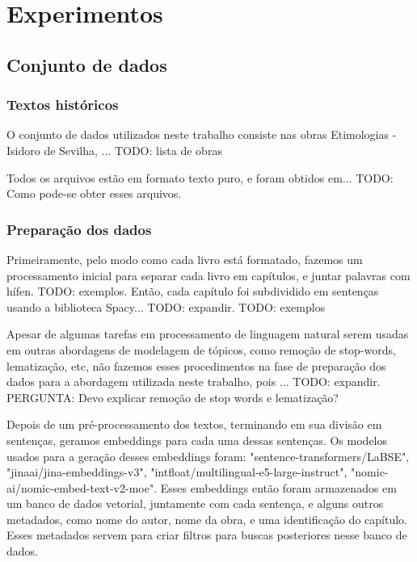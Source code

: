 
\chapter{Experimentos}

\section{Conjunto de dados}
\subsection{Textos históricos}
O conjunto de dados utilizados neste trabalho consiste nas obras Etimologias - Isidoro de Sevilha, ... TODO: lista de obras

Todos os arquivos estão em formato texto puro, e foram obtidos em... TODO: Como pode-se obter esses arquivos.

\subsection{Preparação dos dados}
Primeiramente, pelo modo como cada livro está formatado, fazemos um processamento inicial para separar cada livro em capítulos, e juntar palavras com hífen. TODO: exemplos.
Então, cada capítulo foi subdividido em sentenças usando a biblioteca Spacy... TODO: expandir. TODO: exemplos

Apesar de algumas tarefas em processamento de linguagem natural serem usadas em outras abordagens de modelagem de tópicos, como remoção de stop-words, lematização, etc, não fazemos esses procedimentos na fase de preparação dos dados para a abordagem utilizada neste trabalho, pois ... TODO: expandir. PERGUNTA: Devo explicar remoção de stop words e lematização?

Depois de um pré-processamento dos textos, terminando em sua divisão em sentenças, geramos embeddings para cada uma dessas sentenças. Os modelos usados para a geração desses embeddings foram: "sentence-transformers/LaBSE", "jinaai/jina-embeddings-v3", "intfloat/multilingual-e5-large-instruct", "nomic-ai/nomic-embed-text-v2-moe".
Esses embeddings então foram armazenados em um banco de dados vetorial, juntamente com cada sentença, e alguns outros metadados, como nome do autor, nome da obra, e uma identificação do capítulo. Esses metadados servem para criar filtros para buscas posteriores nesse banco de dados.

